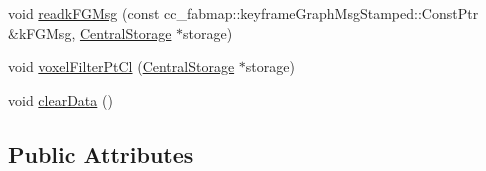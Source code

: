 \begin{DoxyCompactItemize}
\item 
void \hyperlink{classSyncListener_a15eba5d8398bbee26167f14498d39a44}{readk\-F\-G\-Msg} (const cc\-\_\-fabmap\-::keyframe\-Graph\-Msg\-Stamped\-::\-Const\-Ptr \&k\-F\-G\-Msg, \hyperlink{classCentralStorage}{\-Central\-Storage} $\ast$storage)
\item 
void \hyperlink{classSyncListener_a5b6fc157cbff88f505051895be194580}{voxel\-Filter\-Pt\-Cl} (\hyperlink{classCentralStorage}{\-Central\-Storage} $\ast$storage)
\item 
void \hyperlink{classSyncListener_afb1bc8df5e84e851cd63e875222cdaa1}{clear\-Data} ()
\end{DoxyCompactItemize}
\subsection*{\-Public \-Attributes}
